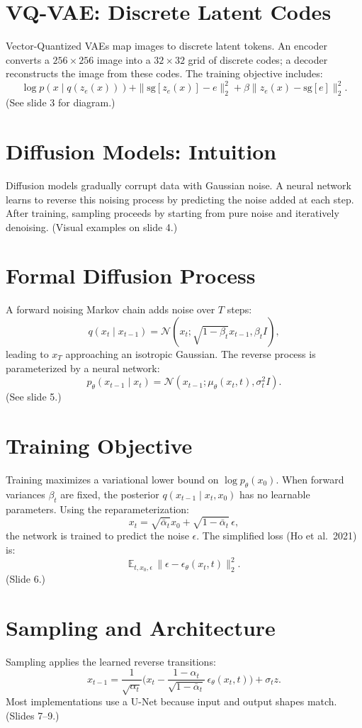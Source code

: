 \documentclass[12pt]{article}
\begin{document}
\psetheader %

\section{VQ-VAE: Discrete Latent Codes}
Vector-Quantized VAEs map images to discrete latent tokens.
An encoder converts a $256\times 256$ image into a $32\times 32$ grid of discrete codes;
a decoder reconstructs the image from these codes.
The training objective includes:
\[
		\log p(x \mid q(z_e(x)))
		+ \| \mathrm{sg}[z_e(x)] - e \|_2^2
		+ \beta \| z_e(x) - \mathrm{sg}[e] \|_2^2 .
\]
(See slide 3 for diagram.)

\section{Diffusion Models: Intuition}
Diffusion models gradually corrupt data with Gaussian noise.
A neural network learns to reverse this noising process by predicting the noise added at each step.
After training, sampling proceeds by starting from pure noise and iteratively denoising.
(Visual examples on slide 4.)

\section{Formal Diffusion Process}
A forward noising Markov chain adds noise over $T$ steps:
\[
		q(x_t \mid x_{t-1}) = \mathcal{N}(x_t; \sqrt{1-\beta_t} x_{t-1}, \beta_t I),
\]
leading to $x_T$ approaching an isotropic Gaussian.
The reverse process is parameterized by a neural network:
\[
		p_\theta(x_{t-1} \mid x_t) = \mathcal{N}(x_{t-1}; \mu_\theta(x_t, t), \sigma_t^2 I).
\]
(See slide 5.)

\section{Training Objective}
Training maximizes a variational lower bound on $\log p_\theta(x_0)$.
When forward variances $\beta_t$ are fixed, the posterior $q(x_{t-1} \mid x_t, x_0)$ has no learnable parameters.
Using the reparameterization:
\[
		x_t = \sqrt{\bar{\alpha}_t}x_0 + \sqrt{1-\bar{\alpha}_t}\,\epsilon,
\]
the network is trained to predict the noise $\epsilon$.
The simplified loss (Ho et al.\ 2021) is:
\[
		\mathbb{E}_{t, x_0, \epsilon}\,\| \epsilon - \epsilon_\theta(x_t, t)\|_2^2 .
\]
(Slide 6.)

\section{Sampling and Architecture}
Sampling applies the learned reverse transitions:
\[
		x_{t-1} = \frac{1}{\sqrt{\alpha_t}}\Big(x_t -
		\frac{1-\alpha_t}{\sqrt{1-\bar{\alpha}_t}}\,\epsilon_\theta(x_t, t)\Big) + \sigma_t z.
\]
Most implementations use a U-Net because input and output shapes match.
(Slides 7--9.)
\end{document}
